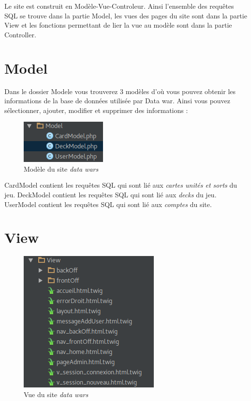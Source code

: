 \documentclass[a4paper, titlepage]{livret}
\begin{document}
	Le site est construit en Modèle-Vue-Controleur. Ainsi l'ensemble des requêtes SQL se trouve dans la partie Model, les vues des pages du site sont dans la partie View et les fonctions permettant de lier la vue au modèle sont dans la partie Controller.

\section{Model}
	Dans le dossier Modele vous trouverez 3 modèles d'où vous pouvez obtenir les informations de la base de données utilisée par Data war. Ainsi vous pouvez sélectionner, ajouter, modifier et supprimer des informations :

	\begin{figure}[th]
		\begin{center}
		\includegraphics[scale=0.4]{Assets/modele.png}
      		\caption{Modèle du site \textit{data wars}}
      		\label{fig2}
     		\end{center}
	\end{figure}
    
	CardModel contient les requêtes SQL qui sont lié aux \textit{cartes unités et sorts} du jeu.
	DeckModel contient les requêtes SQL qui sont lié aux \textit{decks} du jeu.
	UserModel contient les requêtes SQL qui sont lié aux \textit{comptes} du site.    

\section{View}
	\begin{figure}[th]
		\begin{center}
		\includegraphics[scale=0.4]{Assets/view.png}
      		\caption{Vue du site \textit{data wars}}
      		\label{fig3}
     		\end{center}
	\end{figure}
\end{document}

